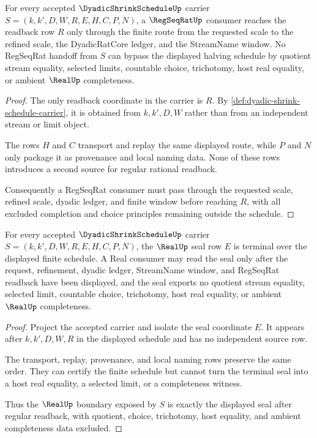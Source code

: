 \begin{theorem}
\label{thm:dyadic-shrink-schedule-regseqrat-handoff}
For every accepted $\DyadicShrinkScheduleUp$ carrier $S=(k,k',D,W,R,E,H,C,P,N)$, a $\RegSeqRatUp$ consumer reaches the readback row $R$ only through the finite route from the requested scale to the refined scale, the DyadicRatCore ledger, and the StreamName window. No RegSeqRat handoff from $S$ can bypass the displayed halving schedule by quotient stream equality, selected limits, countable choice, trichotomy, host real equality, or ambient $\RealUp$ completeness.
\end{theorem}
\begin{proof}
The only readback coordinate in the carrier is $R$. By \autoref{def:dyadic-shrink-schedule-carrier}, it is obtained from $k,k',D,W$ rather than from an independent stream or limit object.

The rows $H$ and $C$ transport and replay the same displayed route, while $P$ and $N$ only package it as provenance and local naming data. None of these rows introduces a second source for regular rational readback.

Consequently a RegSeqRat consumer must pass through the requested scale, refined scale, dyadic ledger, and finite window before reaching $R$, with all excluded completion and choice principles remaining outside the schedule.
\end{proof}

\begin{theorem}
\label{thm:dyadic-shrink-schedule-real-seal-boundary}
For every accepted $\DyadicShrinkScheduleUp$ carrier $S=(k,k',D,W,R,E,H,C,P,N)$, the $\RealUp$ seal row $E$ is terminal over the displayed finite schedule. A Real consumer may read the seal only after the request, refinement, dyadic ledger, StreamName window, and RegSeqRat readback have been displayed, and the seal exports no quotient stream equality, selected limit, countable choice, trichotomy, host real equality, or ambient $\RealUp$ completeness.
\end{theorem}
\begin{proof}
Project the accepted carrier and isolate the seal coordinate $E$. It appears after $k,k',D,W,R$ in the displayed schedule and has no independent source row.

The transport, replay, provenance, and local naming rows preserve the same order. They can certify the finite schedule but cannot turn the terminal seal into a host real equality, a selected limit, or a completeness witness.

Thus the $\RealUp$ boundary exposed by $S$ is exactly the displayed seal after regular readback, with quotient, choice, trichotomy, host equality, and ambient completeness data excluded.
\end{proof}

